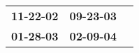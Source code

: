 \begin{supertabular}{p{0.33\columnwidth}p{0.33\columnwidth}p{0.33\columnwidth}}
 \textbf{11-22-02\textsuperscript{}} &  \textbf{09-23-03\textsuperscript{}} \\
 \textbf{01-28-03\textsuperscript{}} &  \textbf{02-09-04\textsuperscript{}} \\
\end{supertabular}
